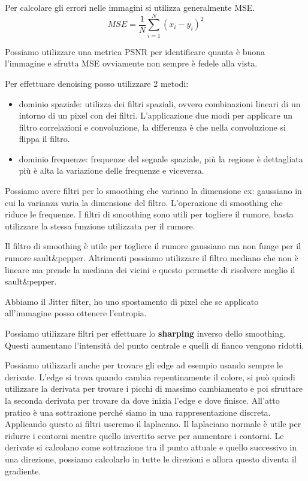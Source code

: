 Per calcolare gli errori nelle immagini si utilizza generalmente MSE.
$$MSE=\frac{1}{N}\sum_{i=1}^{N}(x_i-y_i)^2$$

Possiamo utilizzare una metrica PSNR per identificare quanta è buona l'immagine
e sfrutta MSE ovviamente non sempre è fedele alla vista.

Per effettuare denoising posso utilizzare 2 metodi:
\begin{itemize}
    \item dominio spaziale: utilizza dei filtri spaziali, ovvero combinazioni 
    lineari di un intorno di un pixel con dei filtri. L'applicazione due modi 
    per applicare un filtro correlazioni e convoluzione, la differenza è che nella 
    convoluzione si flippa il filtro.

    \item dominio frequenze: frequenze del segnale spaziale, più la regione è 
    dettagliata più è alta la variazione delle frequenze e viceversa.
\end{itemize}

Possiamo avere filtri per lo smoothing che variano la dimensione ex: gaussiano in cui
la varianza varia la dimensione del filtro. L'operazione di smoothing che riduce 
le frequenze. I filtri di smoothing sono utili per togliere il rumore, basta utilizzare 
la stessa funzione utilizzata per il rumore.

Il filtro di smoothing è utile per togliere il rumore gaussiano ma non funge per il 
rumore sault\&pepper. 
Altrimenti possiamo utilizzare il filtro mediano che non è lineare ma prende la mediana 
dei vicini e questo permette di risolvere meglio il sault\&pepper.

Abbiamo il Jitter filter, ho uno spostamento di pixel che se applicato all'immagine posso 
ottenere l'entropia.

Possiamo utilizzare filtri per effettuare lo \textbf{sharping} inverso dello smoothing.
Questi aumentano l'intensità del punto centrale e quelli di fianco vengono ridotti.

Possiamo utilizzarli anche per trovare gli edge ad esempio usando sempre le derivate.
L'edge si trova quando cambia repentinamente il colore, si può quindi utilizzare 
la derivata per trovare i picchi di massimo cambiamento e poi sfruttare la seconda 
derivata per trovare da dove inizia l'edge e dove finisce. All'atto pratico è una 
sottrazione perché siamo in una rappresentazione discreta. Applicando questo ai 
filtri useremo il laplacano. Il laplaciano normale è utile per ridurre i contorni 
mentre quello invertito serve per aumentare i contorni. Le derivate si calcolano 
come sottrazione tra il punto attuale e quello successivo in una direzione, possiamo 
calcolarlo in tutte le direzioni e allora questo diventa il gradiente. 

